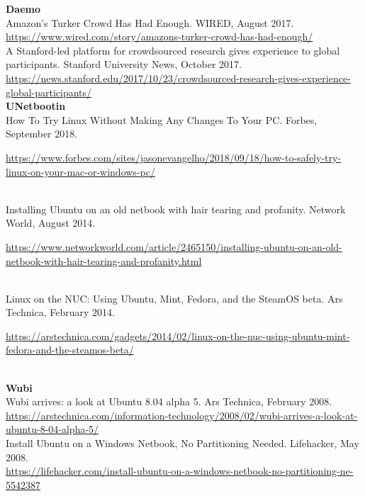\documentclass[10pt,A4]{article}
\begin{document}
\textbf{Daemo}\\

Amazon's Turker Crowd Has Had Enough. WIRED, August 2017.\\
\url{https://www.wired.com/story/amazons-turker-crowd-has-had-enough/}\\

A Stanford-led platform for crowdsourced research gives experience to global participants. Stanford University News, October 2017.\\
\url{https://news.stanford.edu/2017/10/23/crowdsourced-research-gives-experience-global-participants/}\\

\textbf{UNetbootin}\\

How To Try Linux Without Making Any Changes To Your PC. Forbes, September 2018.\\
\begin{small}
\url{https://www.forbes.com/sites/jasonevangelho/2018/09/18/how-to-safely-try-linux-on-your-mac-or-windows-pc/}
\end{small}\\

Installing Ubuntu on an old netbook with hair tearing and profanity. Network World, August 2014.\\
\begin{small}
\small{\url{https://www.networkworld.com/article/2465150/installing-ubuntu-on-an-old-netbook-with-hair-tearing-and-profanity.html}}
\end{small}\\

Linux on the NUC: Using Ubuntu, Mint, Fedora, and the SteamOS beta. Ars Technica, February 2014.\\
\begin{small}
\url{https://arstechnica.com/gadgets/2014/02/linux-on-the-nuc-using-ubuntu-mint-fedora-and-the-steamos-beta/}
\end{small}\\

\textbf{Wubi}\\

Wubi arrives: a look at Ubuntu 8.04 alpha 5. Ars Technica, February 2008.\\
\url{https://arstechnica.com/information-technology/2008/02/wubi-arrives-a-look-at-ubuntu-8-04-alpha-5/}\\

Install Ubuntu on a Windows Netbook, No Partitioning Needed. Lifehacker, May 2008.\\
\url{https://lifehacker.com/install-ubuntu-on-a-windows-netbook-no-partitioning-ne-5542387}\\
\end{document}
